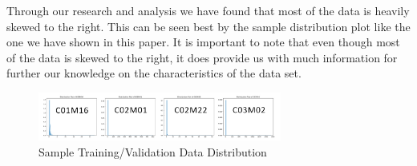 \documentclass[conference]{IEEEtran}
\begin{document}
Through our research and analysis we have found that most of the data is heavily skewed to the right. This can be seen best by the sample distribution plot like the one we have shown in this paper. It is important to note that even though most of the data is skewed to the right, it does provide us with much information for further our knowledge on the characteristics of the data set. 

\begin{figure}
    \centering
    \includegraphics[width=8cm]{img/dist.jpg}
    \caption{Sample Training/Validation Data Distribution}
    \label{fig:my_label}
\end{figure}
\end{document}
